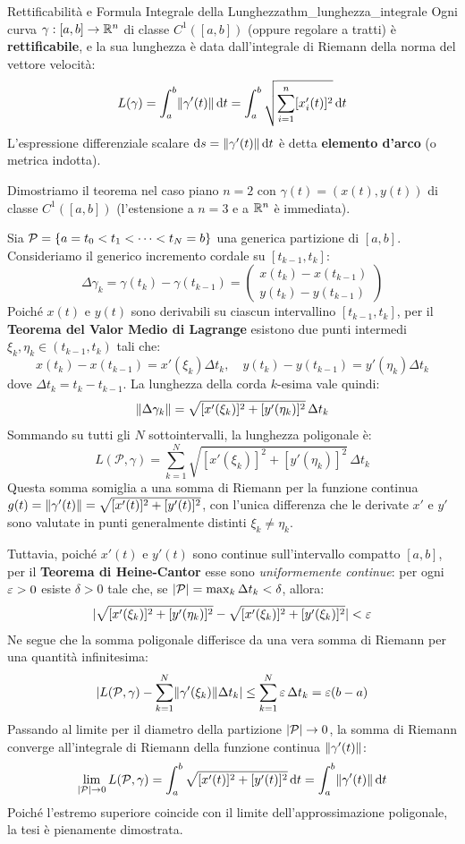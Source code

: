 \begin{teorema}{Rettificabilità e Formula Integrale della Lunghezza}{thm_lunghezza_integrale}
Ogni curva $\gamma: [a,b] \to \mathbb{R}^n$ di classe $C^1([a,b])$ (oppure regolare a tratti) è \textbf{rettificabile}, e la sua lunghezza è data dall'integrale di Riemann della norma del vettore velocità:
\[
L(\gamma) = \int_{a}^{b} \lVert\gamma'(t)\rVert \mathop{}\!\mathrm{d} t = \int_{a}^{b} \sqrt{\sum_{i=1}^n [x_i'(t)]^2} \mathop{}\!\mathrm{d} t
\]
L'espressione differenziale scalare $\mathop{}\!\mathrm{d} s = \lVert\gamma'(t)\rVert\mathop{}\!\mathrm{d} t$ è detta \textbf{elemento d'arco} (o metrica indotta).
\end{teorema}

\begin{dimostrazione}
Dimostriamo il teorema nel caso piano $n=2$ con $\gamma(t) = (x(t), y(t))$ di classe $C^1([a,b])$ (l'estensione a $n=3$ e a $\mathbb{R}^n$ è immediata).

Sia $\mathcal{P} = \{a = t_0 < t_1 < \dots < t_N = b\}$ una generica partizione di $[a,b]$. Consideriamo il generico incremento cordale su $[t_{k-1}, t_k]$:
\[
\Delta \gamma_k = \gamma(t_k) - \gamma(t_{k-1}) = \begin{pmatrix} x(t_k) - x(t_{k-1}) \\ y(t_k) - y(t_{k-1}) \end{pmatrix}
\]
Poiché $x(t)$ e $y(t)$ sono derivabili su ciascun intervallino $[t_{k-1}, t_k]$, per il \textbf{Teorema del Valor Medio di Lagrange} esistono due punti intermedi $\xi_k, \eta_k \in (t_{k-1}, t_k)$ tali che:
\[
x(t_k) - x(t_{k-1}) = x'(\xi_k)\Delta t_k, \quad y(t_k) - y(t_{k-1}) = y'(\eta_k)\Delta t_k
\]
dove $\Delta t_k = t_k - t_{k-1}$. La lunghezza della corda $k$-esima vale quindi:
\[
\lVert\Delta \gamma_k\rVert = \sqrt{[x'(\xi_k)]^2 + [y'(\eta_k)]^2} \, \Delta t_k
\]
Sommando su tutti gli $N$ sottointervalli, la lunghezza poligonale è:
\[
L(\mathcal{P}, \gamma) = \sum_{k=1}^N \sqrt{[x'(\xi_k)]^2 + [y'(\eta_k)]^2} \, \Delta t_k
\]
Questa somma somiglia a una somma di Riemann per la funzione continua $g(t) = \lVert\gamma'(t)\rVert = \sqrt{[x'(t)]^2 + [y'(t)]^2}$, con l'unica differenza che le derivate $x'$ e $y'$ sono valutate in punti generalmente distinti $\xi_k \neq \eta_k$.

Tuttavia, poiché $x'(t)$ e $y'(t)$ sono continue sull'intervallo compatto $[a,b]$, per il \textbf{Teorema di Heine-Cantor} esse sono \emph{uniformemente continue}: per ogni $\varepsilon > 0$ esiste $\delta > 0$ tale che, se $\lvert\mathcal{P}\rvert = \max_k \Delta t_k < \delta$, allora:
\[
\lvert\sqrt{[x'(\xi_k)]^2 + [y'(\eta_k)]^2} - \sqrt{[x'(\xi_k)]^2 + [y'(\xi_k)]^2}\rvert < \varepsilon
\]
Ne segue che la somma poligonale differisce da una vera somma di Riemann per una quantità infinitesima:
\[
\lvert L(\mathcal{P}, \gamma) - \sum_{k=1}^N \lVert\gamma'(\xi_k)\rVert\Delta t_k\rvert \le \sum_{k=1}^N \varepsilon \, \Delta t_k = \varepsilon (b - a)
\]
Passando al limite per il diametro della partizione $\lvert\mathcal{P}\rvert \to 0$, la somma di Riemann converge all'integrale di Riemann della funzione continua $\lVert\gamma'(t)\rVert$:
\[
\lim_{\lvert\mathcal{P}\rvert \to 0} L(\mathcal{P}, \gamma) = \int_{a}^{b} \sqrt{[x'(t)]^2 + [y'(t)]^2} \mathop{}\!\mathrm{d} t = \int_{a}^{b} \lVert\gamma'(t)\rVert \mathop{}\!\mathrm{d} t
\]
Poiché l'estremo superiore coincide con il limite dell'approssimazione poligonale, la tesi è pienamente dimostrata.
\end{dimostrazione}

